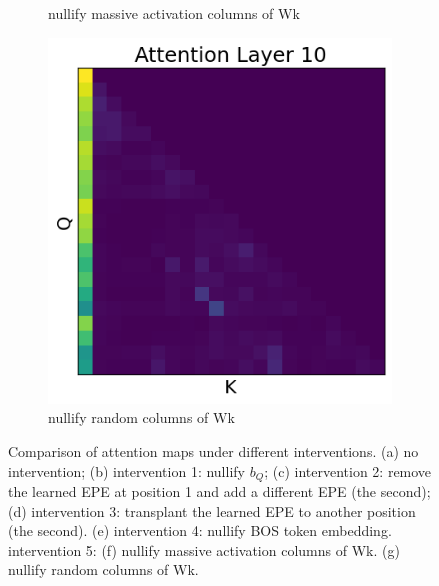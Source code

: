 \documentclass[11pt]{article}
\newif\ifYRMcomments
\newcommand{\YRM}[1]{\ifYRMcomments\textcolor{red}{[YRM: #1]}\fi}
\begin{document}
\begin{figure}[t!]
\begin{subfigure}[t]{0.22\textwidth}
    \caption{nullify massive activation columns of Wk}
    \label{fig:intervention5}
  \end{subfigure}
    \begin{subfigure}[t]{0.22\textwidth}
    \centering
    \includegraphics[width=0.85\columnwidth]{figures/obs4_intervention5_2.png}
    \caption{nullify random columns of Wk}
    \label{fig:intervention5_2}
  \end{subfigure}

  \caption{Comparison of attention maps under different interventions. (a) no intervention; (b) intervention 1: nullify $b_Q$; (c) intervention 2: remove the learned EPE at position 1 and add a different EPE (the second); (d) intervention 3: transplant the learned EPE to another position (the second). (e) intervention 4: nullify BOS token embedding. intervention 5: (f) nullify massive activation columns of Wk. (g) nullify random columns of Wk. \YRM{this is absolutely great, but *must* take up less space. Is there a way to make it smaller without hurting too much? (just making the pic smaller will make the x and y text too small, so we need something more delicate)}} 
  \label{fig:interventions_comparison}
\end{figure}
\end{document}
